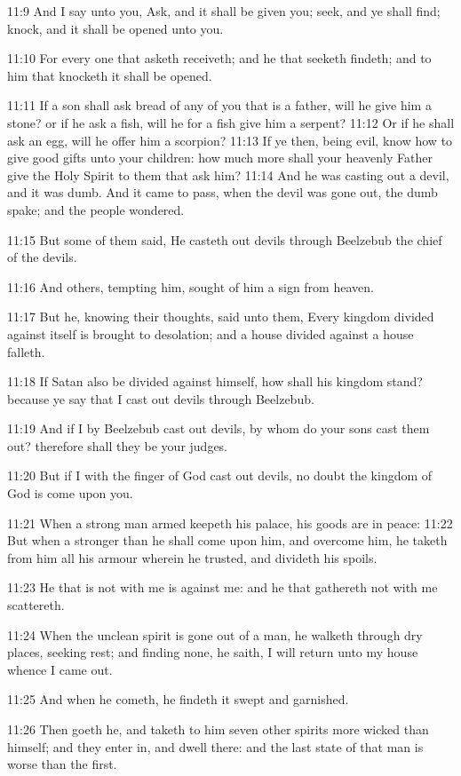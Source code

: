 11:9 And I say unto you, Ask, and it shall be given you; seek, and ye shall find; knock, and it shall be opened unto you.

11:10 For every one that asketh receiveth; and he that seeketh findeth; and to him that knocketh it shall be opened.

11:11 If a son shall ask bread of any of you that is a father, will he give him a stone? or if he ask a fish, will he for a fish give him a serpent?  11:12 Or if he shall ask an egg, will he offer him a scorpion?  11:13 If ye then, being evil, know how to give good gifts unto your children: how much more shall your heavenly Father give the Holy Spirit to them that ask him?  11:14 And he was casting out a devil, and it was dumb. And it came to pass, when the devil was gone out, the dumb spake; and the people wondered.

11:15 But some of them said, He casteth out devils through Beelzebub the chief of the devils.

11:16 And others, tempting him, sought of him a sign from heaven.

11:17 But he, knowing their thoughts, said unto them, Every kingdom divided against itself is brought to desolation; and a house divided against a house falleth.

11:18 If Satan also be divided against himself, how shall his kingdom stand? because ye say that I cast out devils through Beelzebub.

11:19 And if I by Beelzebub cast out devils, by whom do your sons cast them out? therefore shall they be your judges.

11:20 But if I with the finger of God cast out devils, no doubt the kingdom of God is come upon you.

11:21 When a strong man armed keepeth his palace, his goods are in peace: 11:22 But when a stronger than he shall come upon him, and overcome him, he taketh from him all his armour wherein he trusted, and divideth his spoils.

11:23 He that is not with me is against me: and he that gathereth not with me scattereth.

11:24 When the unclean spirit is gone out of a man, he walketh through dry places, seeking rest; and finding none, he saith, I will return unto my house whence I came out.

11:25 And when he cometh, he findeth it swept and garnished.

11:26 Then goeth he, and taketh to him seven other spirits more wicked than himself; and they enter in, and dwell there: and the last state of that man is worse than the first.

